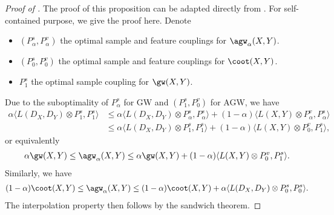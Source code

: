 \begin{proof}[Proof of ]
  The proof of this proposition can be adapted directly from \citep{Vayer19b}.
  For self-contained purpose, we give the proof here. Denote
  \begin{itemize}
      \item $(P^s_{\alpha}, P^v_{\alpha})$ the optimal sample and feature couplings for
      $\agw_{\alpha}(X, Y)$.

      \item $(P^s_0, P^v_0)$ the optimal sample and feature couplings for $\coot(X, Y)$.

      \item $P^s_1$ the optimal sample coupling for $\gw(X, Y)$.
  \end{itemize}
  Due to the suboptimality of $P^s_{\alpha}$ for GW and $(P^s_1, P^v_0)$ for AGW, we have
  \begin{align}
      \alpha \langle L(D_X, D_Y) \otimes P^s_1, P^s_1 \rangle
      &\leq \alpha \langle L(D_X, D_Y) \otimes P^s_{\alpha}, P^s_{\alpha} \rangle
      + (1 - \alpha) \langle L(X, Y) \otimes P^v_{\alpha}, P^s_{\alpha} \rangle \\
      &\leq \alpha \langle L(D_X, D_Y) \otimes P^s_1, P^s_1 \rangle
      + (1 - \alpha) \langle L(X, Y) \otimes P^v_0, P^s_1 \rangle,
  \end{align}
  or equivalently
  \begin{align}
      \alpha \gw(X, Y) \leq \agw_{\alpha}(X, Y) \leq \alpha \gw(X, Y)
      + (1 - \alpha) \langle L(X, Y) \otimes P^v_0, P^s_1 \rangle.
  \end{align}
  Similarly, we have
  \begin{align}
      (1 - \alpha) \coot(X, Y) \leq \agw_{\alpha}(X, Y) \leq (1 - \alpha) \coot(X, Y)
      + \alpha \langle L(D_X, D_Y) \otimes P^s_0, P^s_0 \rangle.
  \end{align}
  The interpolation property then follows by the sandwich theorem.


\end{proof}
